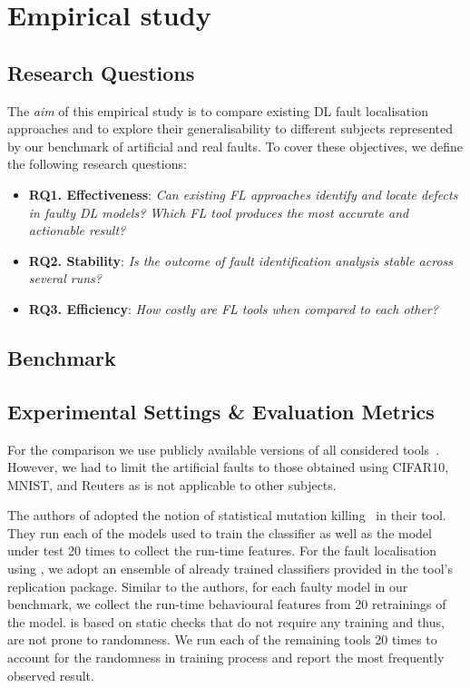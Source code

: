 
\section{Empirical study} \label{sec:empirical_study_fl}

\subsection{Research Questions}

The \textit{aim} of this empirical study is to compare existing DL fault localisation approaches and to explore their generalisability to different subjects represented by our benchmark of artificial and real faults. To cover these objectives, we define the following research questions:

\begin{itemize}
    \item \textbf{RQ1. Effectiveness}: \textit{Can existing FL approaches identify and locate defects in faulty DL models? Which FL tool produces the most accurate and actionable result?}
    \item \textbf{RQ2. Stability}: \textit{Is the outcome of fault identification analysis stable across several runs?}
    \item \textbf{RQ3. Efficiency}: \textit{How costly are FL tools when compared to each other?}
\end{itemize}


\subsection{Benchmark}


\subsection{Experimental Settings \& Evaluation Metrics} \label{sec:exp_fl}
For the comparison we use publicly available versions of all considered tools~\cite{deepfd_replication, umlaut_replication, neuralint_replication, deepdiagnosis_replication}. However, we had to limit the artificial faults to those obtained using CIFAR10, MNIST, and Reuters as \DD is not applicable to other subjects.

The authors of \dfd adopted the notion of statistical mutation killing~\cite{JahangirovaICST20} in their tool. They run each of the models used to train the classifier as well as the model under test 20 times to collect the run-time features. For the fault localisation using \dfd, we adopt an ensemble of already trained classifiers provided in the tool's replication package. Similar to the authors, for each faulty model in our benchmark, we collect the run-time behavioural features from 20 retrainings of the model. \NL is based on static checks that do not require any training and thus, are not prone to randomness. We run each of the remaining tools 20 times to account for the randomness in training process and report the most frequently observed result.

